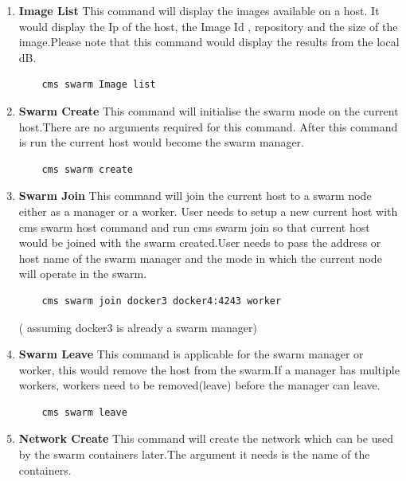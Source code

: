 \documentclass[9pt,twocolumn,twoside]{../../styles/osajnl}
\begin{document}
\begin{enumerate}
    \item \textbf{Image List}
    This command will display the images available on a host.
    It would display the Ip of the host, the Image Id , repository and the size of the image.Please note that this command would display the results from the local dB.\\
    
    \begin{verbatim}
    cms swarm Image list
    \end{verbatim} 

    
    \item \textbf{Swarm Create}
    This command will initialise the  swarm mode on the current host.There are no arguments required for this command. After this command is run the current host would become the swarm manager.\\
    
    \begin{verbatim}
    cms swarm create
    \end{verbatim} 
    
    \item \textbf{Swarm Join}
    This command will join the current host to a swarm node either as a manager or a worker. User needs to setup a new current host with cms swarm host command and run cms swarm join so that current host would be joined with the swarm created.User needs to pass the address or host name of the swarm manager and the mode in which the current node will operate in the swarm.\\
    
    \begin{verbatim}
    cms swarm join docker3 docker4:4243 worker
    \end{verbatim} 
    ( assuming docker3 is already a swarm manager) 
    
    \item \textbf{Swarm Leave}
    This command is applicable for the swarm manager or worker, this would remove the host from the swarm.If a manager has multiple workers, workers need to be removed(leave) before the manager can leave.\\
    
    \begin{verbatim}
    cms swarm leave 
    \end{verbatim}

    
    \item \textbf{Network Create}
    This command will create the network which can be used by the swarm containers later.The argument it needs is the name of the containers.
    

\end{enumerate}
\end{document}
